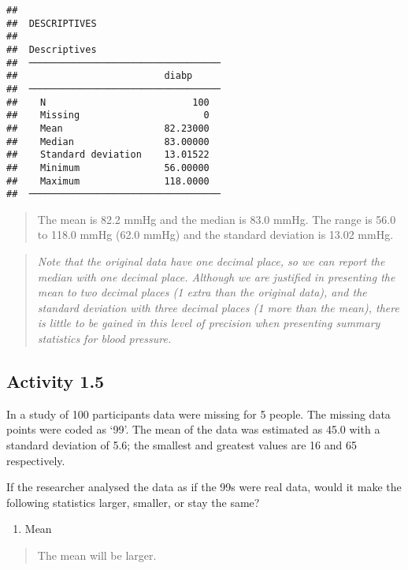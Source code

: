 \documentclass[
]{memoir}
\providecommand{\tightlist}{%
  \setlength{\itemsep}{0pt}\setlength{\parskip}{0pt}}
\begin{document}
\begin{verbatim}
## 
##  DESCRIPTIVES
## 
##  Descriptives                       
##  ────────────────────────────────── 
##                          diabp      
##  ────────────────────────────────── 
##    N                          100   
##    Missing                      0   
##    Mean                  82.23000   
##    Median                83.00000   
##    Standard deviation    13.01522   
##    Minimum               56.00000   
##    Maximum               118.0000   
##  ──────────────────────────────────
\end{verbatim}

\begin{quote}
The mean is 82.2 mmHg and the median is 83.0 mmHg. The range is 56.0 to 118.0 mmHg (62.0 mmHg) and the standard deviation is 13.02 mmHg.
\end{quote}

\begin{quote}
\emph{Note that the original data have one decimal place, so we can report the median with one decimal place. Although we are justified in presenting the mean to two decimal places (1 extra than the original data), and the standard deviation with three decimal places (1 more than the mean), there is little to be gained in this level of precision when presenting summary statistics for blood pressure.}
\end{quote}

\hypertarget{activity-1.5}{%
\subsection*{Activity 1.5}\label{activity-1.5}}

In a study of 100 participants data were missing for 5 people. The missing data points were coded as `99'. The mean of the data was estimated as 45.0 with a standard deviation of 5.6; the smallest and greatest values are 16 and 65 respectively.

If the researcher analysed the data as if the 99s were real data, would it make the following statistics larger, smaller, or stay the same?

\begin{enumerate}
\def\labelenumi{\alph{enumi})}
\tightlist
\item
  Mean
\end{enumerate}

\begin{quote}
The mean will be larger.
\end{quote}
\end{document}

